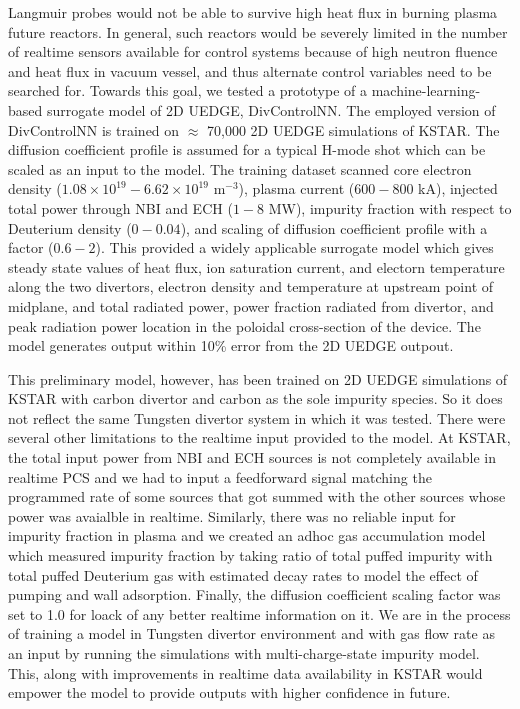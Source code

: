 Langmuir probes would not be able to survive high heat flux in burning plasma future reactors. In general, such reactors would be severely limited in the number of realtime sensors available for control systems because of high neutron fluence and heat flux in vacuum vessel, and thus alternate control variables need to be searched for. Towards this goal, we tested a prototype of a machine-learning-based surrogate model of 2D UEDGE, DivControlNN. The employed version of DivControlNN is trained on $\approx$ 70,000 2D UEDGE simulations of KSTAR. The diffusion coefficient profile is assumed for a typical H-mode shot which can be scaled as an input to the model. The training dataset scanned core electron density ($1.08 \times 10^{19} - 6.62 \times 10^{19}$ m$^{-3}$), plasma current ($600-800$ kA), injected total power through NBI and ECH ($1-8$ MW), impurity fraction with respect to Deuterium density ($0-0.04$), and scaling of diffusion coefficient profile with a factor ($0.6 - 2$). This provided a widely applicable surrogate model which gives steady state values of heat flux, ion saturation current, and electorn temperature along the two divertors, electron density and temperature at upstream point of midplane, and total radiated power, power fraction radiated from divertor, and peak radiation power location in the poloidal cross-section of the device. The model generates output within 10\% error from the 2D UEDGE outpout.

This preliminary model, however, has been trained on 2D UEDGE simulations of KSTAR with carbon divertor and carbon as the sole impurity species. So it does not reflect the same Tungsten divertor system in which it was tested. There were several other limitations to the realtime input provided to the model. At KSTAR, the total input power from NBI and ECH sources is not completely available in realtime PCS and we had to input a feedforward signal matching the programmed rate of some sources that got summed with the other sources whose power was avaialble in realtime. Similarly, there was no reliable input for impurity fraction in plasma and we created an adhoc gas accumulation model which measured impurity fraction by taking ratio of total puffed impurity with total puffed Deuterium gas with estimated decay rates to model the effect of pumping and wall adsorption. Finally, the diffusion coefficient scaling factor was set to 1.0 for loack of any better realtime information on it. We are in the process of training a model in Tungsten divertor environment and with gas flow rate as an input by running the simulations with multi-charge-state impurity model. This, along with improvements in realtime data availability in KSTAR would empower the model to provide outputs with higher confidence in future.

